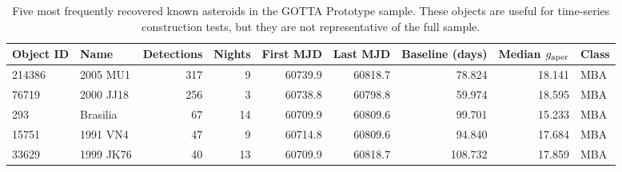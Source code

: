 \begin{table}[!htbp]
\centering
\caption{Five most frequently recovered known asteroids in the GOTTA Prototype sample. These objects are useful for time-series construction tests, but they are not representative of the full sample.}
\label{tab:most_observed_objects}
\scriptsize
\setlength{\tabcolsep}{3.5pt}
\renewcommand{\arraystretch}{1.12}
\begin{tabular}{llrrrrrrl}
\toprule
Object ID & Name & Detections & Nights & First MJD & Last MJD & Baseline (days) & Median $g_{\rm aper}$ & Class \\
\midrule
214386 & 2005 MU1 & 317 & 9 & 60739.9 & 60818.7 & 78.824 & 18.141 & MBA \\
76719 & 2000 JJ18 & 256 & 3 & 60738.8 & 60798.8 & 59.974 & 18.595 & MBA \\
293 & Brasilia & 67 & 14 & 60709.9 & 60809.6 & 99.701 & 15.233 & MBA \\
15751 & 1991 VN4 & 47 & 9 & 60714.8 & 60809.6 & 94.840 & 17.684 & MBA \\
33629 & 1999 JK76 & 40 & 13 & 60709.9 & 60818.7 & 108.732 & 17.859 & MBA \\
\bottomrule
\end{tabular}
\end{table}
